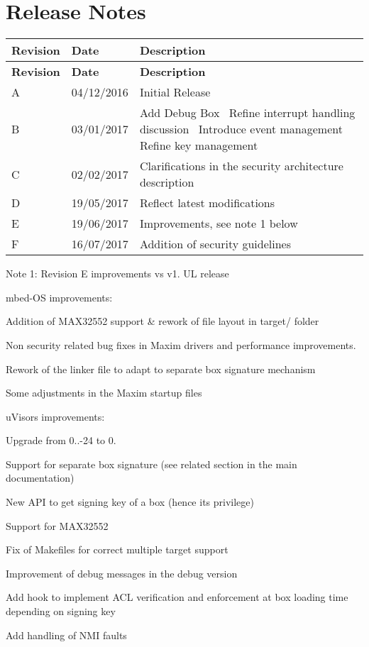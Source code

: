\hypertarget{_r_e_l_e_a_s_e__n_o_t_e_s_rn}{}\section{Release Notes}\label{_r_e_l_e_a_s_e__n_o_t_e_s_rn}
\tabulinesep=1mm
\begin{longtabu} spread 0pt [c]{*{3}{|X[-1]}|}
\hline
\rowcolor{\tableheadbgcolor}\textbf{ Revision }&\textbf{ Date }&\textbf{ Description  }\\
\endfirsthead
\hline
\endfoot
\hline
\rowcolor{\tableheadbgcolor}\textbf{ Revision }&\textbf{ Date }&\textbf{ Description  }\\
\endhead
A &04/12/2016 &Initial Release \\
B &03/01/2017 &Add Debug Box~\newline
Refine interrupt handling discussion~\newline
Introduce event management~\newline
 Refine key management \\
C &02/02/2017 &Clarifications in the security architecture description \\
D &19/05/2017 &Reflect latest modifications \\
E &19/06/2017 &Improvements, see note 1 below \\
F &16/07/2017 &Addition of security guidelines \\
\end{longtabu}


Note 1\+: Revision E improvements vs v1. UL release

mbed-\/\+OS improvements\+:
\begin{DoxyItemize}
\item Addition of M\+A\+X32552 support \& rework of file layout in target/ folder
\item Non security related bug fixes in Maxim drivers and performance improvements.
\item Rework of the linker file to adapt to separate box signature mechanism
\item Some adjustments in the Maxim startup files
\end{DoxyItemize}

u\+Visor\textquotesingle{}s improvements\+:
\begin{DoxyItemize}
\item Upgrade from 0..-\/24 to 0.
\item Support for separate box signature (see related section in the main documentation)
\item New A\+PI to get signing key of a box (hence it\textquotesingle{}s privilege)
\item Support for M\+A\+X32552
\item Fix of Makefiles for correct multiple target support
\item Improvement of debug messages in the debug version
\item Add hook to implement A\+CL verification and enforcement at box loading time depending on signing key
\item Add handling of N\+MI faults
\end{DoxyItemize}

